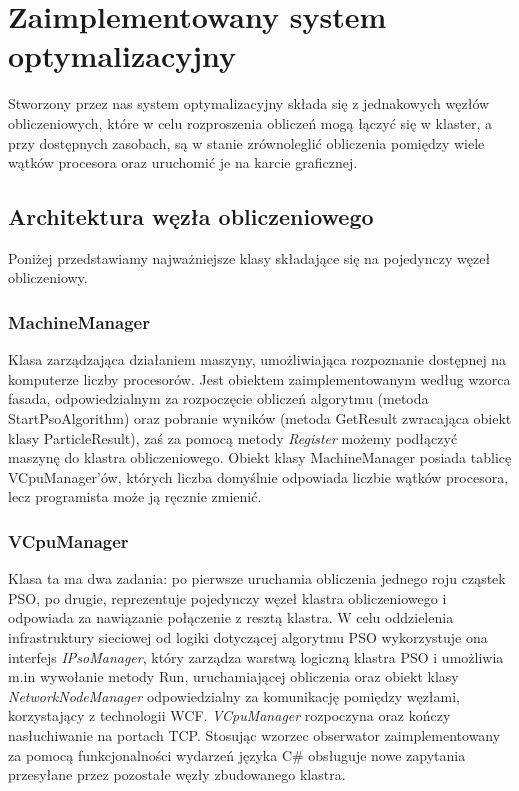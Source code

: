 \documentclass[12pt, twoside, openany, abstract=on]{report}
\theoremstyle{definition}
\begin{document}

\chapter{Zaimplementowany system optymalizacyjny}

Stworzony przez nas system optymalizacyjny składa się z jednakowych węzłów obliczeniowych, które w celu rozproszenia obliczeń mogą łączyć się w klaster, a przy dostępnych zasobach, są w stanie zrównoleglić obliczenia pomiędzy wiele wątków procesora oraz uruchomić je na karcie graficznej.


\section{Architektura węzła obliczeniowego}

Poniżej przedstawiamy najważniejsze klasy składające się na pojedynczy węzeł obliczeniowy. 


\subsection{MachineManager}
Klasa zarządzająca działaniem maszyny, umożliwiająca rozpoznanie dostępnej na komputerze liczby procesorów. Jest obiektem zaimplementowanym według wzorca fasada, odpowiedzialnym za rozpoczęcie obliczeń algorytmu (metoda StartPsoAlgorithm) oraz pobranie wyników (metoda GetResult zwracająca obiekt klasy ParticleResult), zaś za pomocą metody \emph{Register} możemy podłączyć maszynę do klastra obliczeniowego. Obiekt klasy MachineManager posiada tablicę VCpuManager'ów, których liczba domyślnie odpowiada liczbie wątków procesora, lecz programista może ją ręcznie zmienić.

\subsection{VCpuManager}
Klasa ta ma dwa zadania: 
po pierwsze uruchamia obliczenia jednego roju cząstek PSO, po drugie, reprezentuje pojedynczy węzeł klastra obliczeniowego i odpowiada za nawiązanie połączenie z resztą klastra. W celu oddzielenia infrastruktury sieciowej od logiki dotyczącej algorytmu PSO wykorzystuje ona interfejs \emph{IPsoManager}, który zarządza warstwą logiczną klastra PSO i umożliwia m.in wywołanie metody Run, uruchamiającej obliczenia oraz obiekt klasy \emph{NetworkNodeManager} odpowiedzialny za komunikację pomiędzy węzłami, korzystający z technologii WCF. \emph{VCpuManager} rozpoczyna oraz kończy nasłuchiwanie na portach TCP. Stosując wzorzec obserwator zaimplementowany za pomocą funkcjonalności wydarzeń języka C\# obsługuje nowe zapytania przesyłane przez pozostałe węzły zbudowanego klastra.
\end{document}
